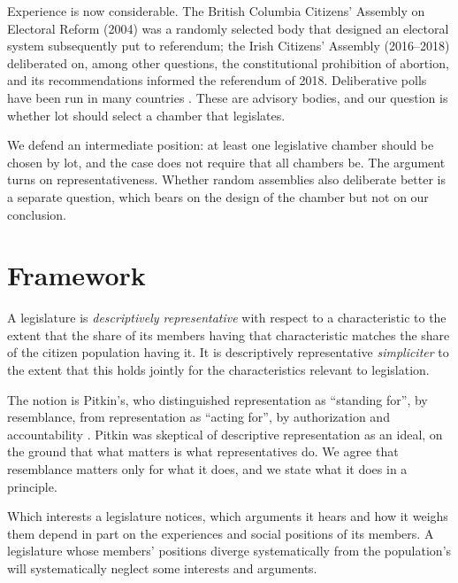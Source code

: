 \documentclass{situationist-preprint}
\begin{document}
Experience is now considerable. The British Columbia Citizens' Assembly on Electoral Reform (2004) was a randomly selected body that designed an electoral system subsequently put to referendum; the Irish Citizens' Assembly (2016--2018) deliberated on, among other questions, the constitutional prohibition of abortion, and its recommendations informed the referendum of 2018. Deliberative polls have been run in many countries \citep{Fishkin2009}. These are advisory bodies, and our question is whether lot should select a chamber that legislates.

We defend an intermediate position: at least one legislative chamber should be chosen by lot, and the case does not require that all chambers be. The argument turns on representativeness. Whether random assemblies also deliberate better is a separate question, which bears on the design of the chamber but not on our conclusion.

\section{Framework}

\begin{definition}\label{d:descriptive}
A legislature is \emph{descriptively representative} with respect to a characteristic to the extent that the share of its members having that characteristic matches the share of the citizen population having it. It is descriptively representative \emph{simpliciter} to the extent that this holds jointly for the characteristics relevant to legislation.
\end{definition}

The notion is Pitkin's, who distinguished representation as \enquote{standing for}, by resemblance, from representation as \enquote{acting for}, by authorization and accountability \citep{Pitkin1967}. Pitkin was skeptical of descriptive representation as an ideal, on the ground that what matters is what representatives do. We agree that resemblance matters only for what it does, and we state what it does in a principle.

\begin{principle}[Perspective]\label{p:perspective}
Which interests a legislature notices, which arguments it hears and how it weighs them depend in part on the experiences and social positions of its members. A legislature whose members' positions diverge systematically from the population's will systematically neglect some interests and arguments.
\end{principle}
\end{document}
